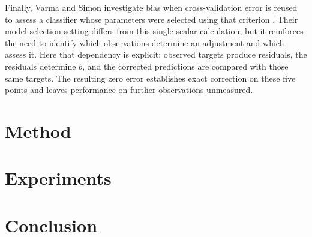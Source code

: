 \documentclass[11pt]{article}
\begin{document}
Finally, Varma and Simon investigate bias when cross-validation error is reused to assess a classifier whose parameters were selected using that criterion \cite{Varma2006BiasError}. Their model-selection setting differs from this single scalar calculation, but it reinforces the need to identify which observations determine an adjustment and which assess it. Here that dependency is explicit: observed targets produce residuals, the residuals determine $b$, and the corrected predictions are compared with those same targets. The resulting zero error establishes exact correction on these five points and leaves performance on further observations unmeasured.

\section{Method}
\section{Experiments}
\section{Conclusion}


\end{document}

